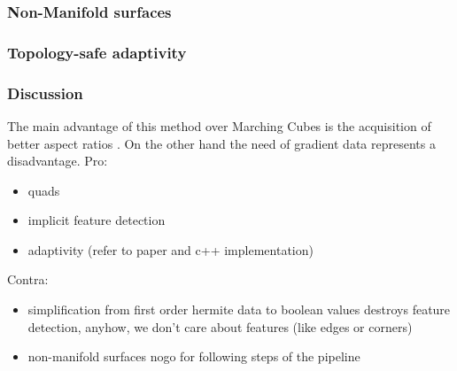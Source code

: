 \subsubsection{Non-Manifold surfaces}

\subsubsection{Topology-safe adaptivity}

\subsubsection{Discussion}
The main advantage of this method over Marching Cubes is the acquisition of better aspect ratios \cite{Hermite2002}. On the other hand the need of gradient data
represents a disadvantage. 
Pro:
\begin{itemize}
\item quads
\item implicit feature detection
\item adaptivity (refer to paper and c++ implementation)
\end{itemize}
Contra:
\begin{itemize}
\item simplification from first order hermite data to boolean values destroys feature detection, anyhow, we don't care about features (like edges or corners)
\item non-manifold surfaces nogo for following steps of the pipeline
\end{itemize}






